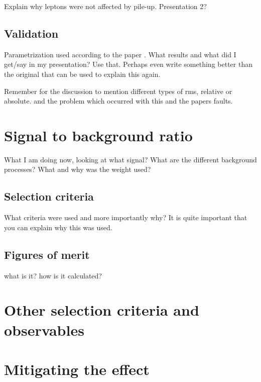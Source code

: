 Explain why leptons were not affected by pile-up. Presentation 2?

\subsection{Validation}
Parametrization used according to the paper \citep{ATL-PHYS-PUB-2013-004}. What results and what did I get/say in my presentation? Use that. Perhaps even write something better than the original that can be used to explain this again.

Remember for the discussion to mention different types of rms, relative or absolute. and the problem which occurred with this and the papers faults.

\section{Signal to background ratio}
What I am doing now, looking at what signal? What are the different background processes? What and why was the weight used?
\subsection{Selection criteria}
What criteria were used and more importantly why? It is quite important that you can explain why this was used. 	
\subsection{Figures of merit}
what is it? how is it calculated?
\section{Other selection criteria and observables}
\section{Mitigating the effect}